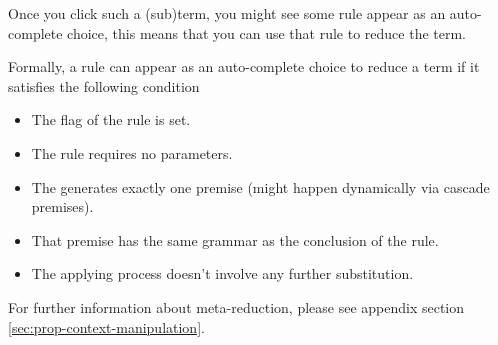 \documentclass[master.tex]{subfiles}
\begin{document}
Once you click such a (sub)term, you might see some rule appear as an
auto-complete choice, this means that you can use that rule to reduce the term.

Formally, a rule can appear as an auto-complete choice to reduce a term if it
satisfies the following condition
\begin{itemize}
\item The \kAllowReduction flag of the rule is set.
\item The rule requires no parameters.
\item The generates exactly one premise (might happen dynamically via cascade
  premises).
\item That premise has the same grammar as the conclusion of the rule.
\item The applying process doesn't involve any further substitution.
\end{itemize}

For further information about meta-reduction, please see appendix section
\ref{sec:prop-context-manipulation}.
\end{document}
